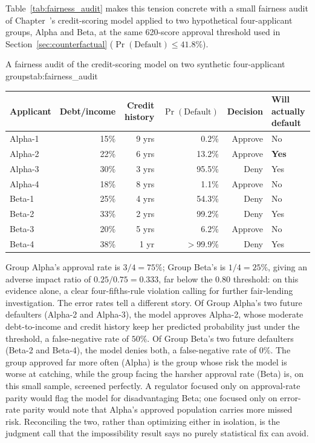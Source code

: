 \documentclass[../ai_in_finance]{subfiles}
\begin{document}
Table~\ref{tab:fairness_audit} makes this tension concrete with a small fairness audit of Chapter~'s credit-scoring model applied to two hypothetical four-applicant groups, Alpha and Beta, at the same 620-score approval threshold used in Section~\ref{sec:counterfactual} ($\Pr(\text{Default}) \le 41.8\%$).

\begin{booktable}[htbp]{A fairness audit of the credit-scoring model on two synthetic four-applicant groups}{tab:fairness_audit}
\begin{tabular}{lrrrrl}
\toprule
Applicant & Debt/income & Credit history & $\Pr(\text{Default})$ & Decision & Will actually default \\
\midrule
Alpha-1 & 15\% & 9 yrs & 0.2\% & Approve & No \\
Alpha-2 & 22\% & 6 yrs & 13.2\% & Approve & \textbf{Yes} \\
Alpha-3 & 30\% & 3 yrs & 95.5\% & Deny & Yes \\
Alpha-4 & 18\% & 8 yrs & 1.1\% & Approve & No \\
\midrule
Beta-1 & 25\% & 4 yrs & 54.3\% & Deny & No \\
Beta-2 & 33\% & 2 yrs & 99.2\% & Deny & Yes \\
Beta-3 & 20\% & 5 yrs & 6.2\% & Approve & No \\
Beta-4 & 38\% & 1 yr & $>$99.9\% & Deny & Yes \\
\bottomrule
\end{tabular}
\end{booktable}

Group Alpha's approval rate is $3/4 = 75\%$; Group Beta's is $1/4 = 25\%$, giving an adverse impact ratio of $0.25/0.75 = 0.333$, far below the 0.80 threshold: on this evidence alone, a clear four-fifths-rule violation calling for further fair-lending investigation. The error rates tell a different story. Of Group Alpha's two future defaulters (Alpha-2 and Alpha-3), the model approves Alpha-2, whose moderate debt-to-income and credit history keep her predicted probability just under the threshold, a false-negative rate of $50\%$. Of Group Beta's two future defaulters (Beta-2 and Beta-4), the model denies both, a false-negative rate of $0\%$. The group approved far more often (Alpha) is the group whose risk the model is worse at catching, while the group facing the harsher approval rate (Beta) is, on this small sample, screened perfectly. A regulator focused only on approval-rate parity would flag the model for disadvantaging Beta; one focused only on error-rate parity would note that Alpha's approved population carries more missed risk. Reconciling the two, rather than optimizing either in isolation, is the judgment call that the impossibility result says no purely statistical fix can avoid.
\end{document}
